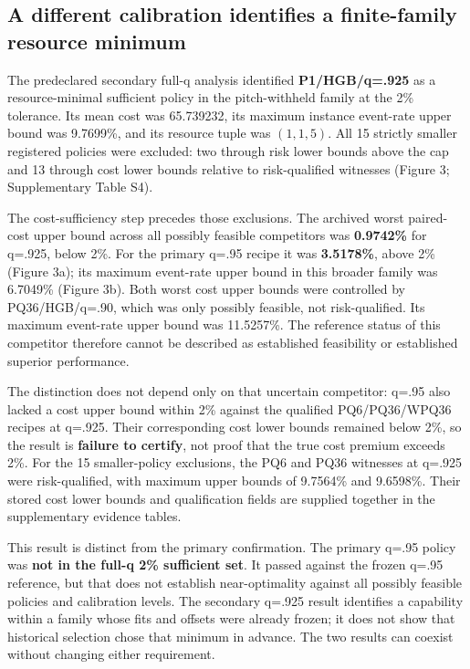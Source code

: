 \documentclass[
  british,
  11pt,
]{article}
\begin{document}
\subsection{A different calibration identifies a finite-family resource
minimum}\label{a-different-calibration-identifies-a-finite-family-resource-minimum}

The predeclared secondary full-q analysis identified
\textbf{P1/HGB/q=.925} as a resource-minimal sufficient policy in the
pitch-withheld family at the 2\% tolerance. Its mean cost was 65.739232,
its maximum instance event-rate upper bound was 9.7699\%, and its
resource tuple was \((1,1,5)\). All 15 strictly smaller registered
policies were excluded: two through risk lower bounds above the cap and
13 through cost lower bounds relative to risk-qualified witnesses
(Figure 3; Supplementary Table S4).

The cost-sufficiency step precedes those exclusions. The archived worst
paired-cost upper bound across all possibly feasible competitors was
\textbf{0.9742\%} for q=.925, below 2\%. For the primary q=.95 recipe it
was \textbf{3.5178\%}, above 2\% (Figure 3a); its maximum event-rate
upper bound in this broader family was 6.7049\% (Figure 3b). Both worst
cost upper bounds were controlled by PQ36/HGB/q=.90, which was only
possibly feasible, not risk-qualified. Its maximum event-rate upper
bound was 11.5257\%. The reference status of this competitor therefore
cannot be described as established feasibility or established superior
performance.

The distinction does not depend only on that uncertain competitor: q=.95
also lacked a cost upper bound within 2\% against the qualified
PQ6/PQ36/WPQ36 recipes at q=.925. Their corresponding cost lower bounds
remained below 2\%, so the result is \textbf{failure to certify}, not
proof that the true cost premium exceeds 2\%. For the 15 smaller-policy
exclusions, the PQ6 and PQ36 witnesses at q=.925 were risk-qualified,
with maximum upper bounds of 9.7564\% and 9.6598\%. Their stored cost
lower bounds and qualification fields are supplied together in the
supplementary evidence tables.

This result is distinct from the primary confirmation. The primary q=.95
policy was \textbf{not in the full-q 2\% sufficient set}. It passed
against the frozen q=.95 reference, but that does not establish
near-optimality against all possibly feasible policies and calibration
levels. The secondary q=.925 result identifies a capability within a
family whose fits and offsets were already frozen; it does not show that
historical selection chose that minimum in advance. The two results can
coexist without changing either requirement.
\end{document}

